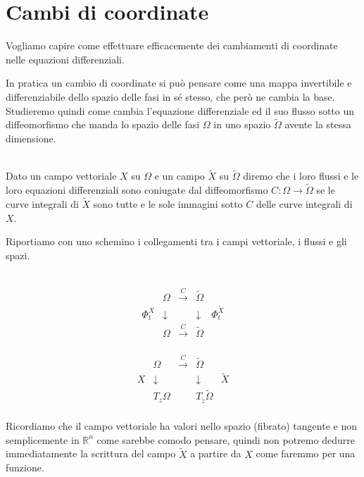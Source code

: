 \documentclass[11pt,a4paper,twoside]{book}
\newenvironment{definizione}[1][\empty]{\begin{Definizione}{
\ifx\empty#1\relax\else\mdseries\itshape#1\\\fi
}{}}{\end{Definizione}}
\theoremstyle{esss}
\theoremstyle{dotless}
\numberwithin{equation}{section} %
\begin{document}
\section{Cambi di coordinate}

Vogliamo capire come effettuare efficacemente dei cambiamenti di coordinate nelle equazioni differenziali.

In pratica un cambio di coordinate si può pensare come una mappa invertibile e differenziabile dello spazio delle fasi in sé stesso, che però ne cambia la base. Studieremo quindi come cambia l'equazione differenziale ed il suo flusso sotto un diffeomorfismo che manda lo spazio delle fasi $\Omega$ in uno spazio $\tilde{\Omega}$ avente la stessa dimensione.

\begin{definizione}
Dato un campo vettoriale $X$ su $\Omega$ e un campo $\tilde{X}$ su $\tilde{\Omega}$ diremo che i loro flussi e le loro equazioni differenziali sono coniugate dal diffeomorfismo $C:\Omega\rightarrow\tilde{\Omega}$ se le curve integrali di $\tilde{X}$ sono tutte e le sole immagini sotto $C$ delle curve integrali di $X$.
\end{definizione}


Riportiamo con uno schemino i collegamenti tra i campi vettoriale, i flussi e gli spazi.\\
$ $\\
\begin{minipage}[H]{0.45\linewidth}
\[
\begin{array}{ccccc}
&\Omega & \overset{C}{\longrightarrow} & \tilde{\Omega}&\\
\Phi_t^X & \downarrow & & \downarrow & \Phi_t^{\tilde{X}}\\
& \Omega & \overset{C}{\longrightarrow} & \tilde{\Omega} & \\
\end{array}
\]
\end{minipage}
\begin{minipage}[H]{0.45\linewidth}
\[
\begin{array}{ccccc}
&\Omega & \overset{C}{\longrightarrow} & \tilde{\Omega} & \\
X & \downarrow & & \downarrow &  \tilde{X}\\
& T_z\Omega &  & T_{\tilde{z}}\tilde{\Omega} & \\
\end{array}
\]
\end{minipage}

Ricordiamo che il campo vettoriale ha valori nello spazio (fibrato) tangente e non semplicemente in $\mathbb{R}^n$ come sarebbe comodo pensare, quindi non potremo dedurre immediatamente la scrittura del campo $\tilde{X}$ a partire da $X$ come faremmo per una funzione. 
\end{document}
